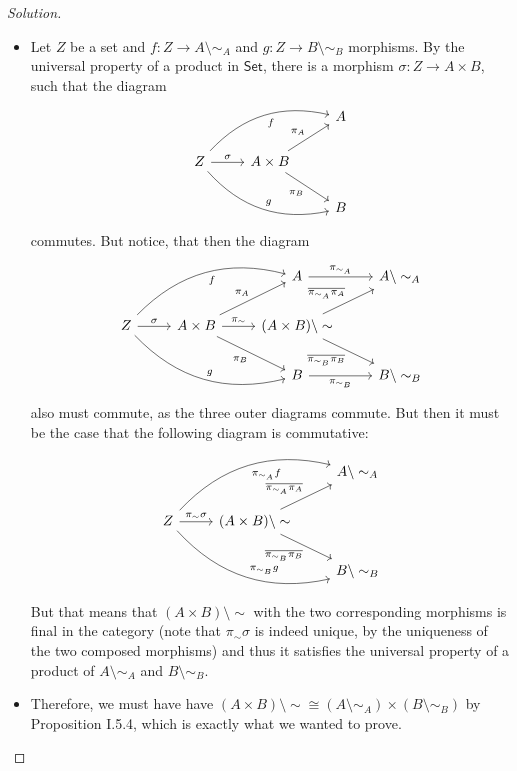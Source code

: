\documentclass{article}
\theoremstyle{definition}
\newenvironment{solution}{
	\begin{proof}[Solution]
		\vspace{-8px}
		\setlength{\parskip}{4px}
		\setlength{\parindent}{0px}
	}{
\end{proof}
}
\newcommand{\Cset}{\mathsf{Set}}
\begin{document}
\begin{solution}
\begin{itemize}
		\item Let $Z$ be a set and $f: Z \to A \setminus \sim_A$ and $g: Z \to B \setminus \sim_B$ morphisms. By the universal property of a product in $\Cset$, there is a morphism $\sigma: Z \to A \times B$, such that the diagram
		\begin{equation*}
			\begin{tikzcd}
				& & A\\
				Z
					\arrow[r, "\sigma"]
					\arrow[urr, bend left, "f" swap]
					\arrow[drr, bend right, "g"] 
					& A \times B
						\arrow[ur, "\pi_A"]
						\arrow[dr, "\pi_B" swap] &\\
				& & B
			\end{tikzcd}
		\end{equation*}
		commutes. But notice, that then the diagram
		\begin{equation*}
			\begin{tikzcd}
				& & A \arrow[r, "\pi_{\sim_A}"] & A \setminus \sim_A \\
				Z
					\arrow[r, "\sigma"]
					\arrow[urr, bend left, "f" swap]
					\arrow[drr, bend right, "g"] 
					& A \times B
						\arrow[ur, "\pi_A"]
						\arrow[dr, "\pi_B" swap]
						\arrow[r, "\pi_\sim"]
					& (A \times B) \setminus \sim
						\arrow[ur, "\overline{\pi_{\sim_A} \pi_A}"]
						\arrow[dr, "\overline{\pi_{\sim_B} \pi_B}" swap]
					& \\
				& & B \arrow[r, "\pi_{\sim_B}" swap] & B \setminus \sim_B
			\end{tikzcd}
		\end{equation*}
		also must commute, as the three outer diagrams commute. But then it must be the case that the following diagram is commutative:
		\begin{equation*}
			\begin{tikzcd}
				& & A \setminus \sim_A \\
				Z
					\arrow[r, "\pi_\sim \sigma"]
					\arrow[urr, bend left, "\pi_{\sim_A} f" swap]
					\arrow[drr, bend right, "\pi_{\sim_B} g"] 
					& (A \times B) \setminus \sim
						\arrow[ur, "\overline{\pi_{\sim_A} \pi_A}"]
						\arrow[dr, "\overline{\pi_{\sim_B} \pi_B}" swap]
					&\\
				& & B \setminus \sim_B
			\end{tikzcd}
		\end{equation*}
		But that means that $(A \times B) \setminus \sim$ with the two corresponding morphisms is final in the category (note that $\pi_\sim\sigma$ is indeed unique, by the uniqueness of the two composed morphisms) and thus it satisfies the universal property of a product of $A \setminus \sim_A$ and $B \setminus \sim_B$.
		\item Therefore, we must have have $(A \times B) \setminus \sim \cong (A \setminus \sim_A) \times (B \setminus \sim_B)$ by Proposition I.5.4, which is exactly what we wanted to prove.
	\end{itemize}
\end{solution}
\end{document}
